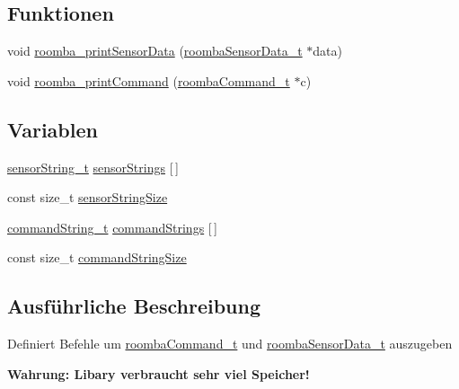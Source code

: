 \subsection*{Funktionen}
\begin{DoxyCompactItemize}
\item 
void \hyperlink{group__roomba__print_ga6def1c53657c293448ed92c962ae81c1}{roomba\-\_\-print\-Sensor\-Data} (\hyperlink{group__roomba__def_gab15b5566c76fa573575afaccd593e86a}{roomba\-Sensor\-Data\-\_\-t} $\ast$data)
\item 
void \hyperlink{group__roomba__print_ga9b86b796d2df9340222c95e7124239dd}{roomba\-\_\-print\-Command} (\hyperlink{group__roomba__def_gae2455d95f239542954d232e31bb04a0e}{roomba\-Command\-\_\-t} $\ast$c)
\end{DoxyCompactItemize}
\subsection*{Variablen}
\begin{DoxyCompactItemize}
\item 
\hyperlink{group__roomba__print_gaf352ce472b626ebab957aab98d88e93f}{sensor\-String\-\_\-t} \hyperlink{group__roomba__print_ga6c1d8b935c25685ddc669cf5732959c9}{sensor\-Strings} \mbox{[}$\,$\mbox{]}
\item 
const size\-\_\-t \hyperlink{group__roomba__print_gabad382977fd4c5e46c059079738e61a5}{sensor\-String\-Size}
\item 
\hyperlink{group__roomba__print_ga9592eed8fec0d1b2dbe577e30b8bc959}{command\-String\-\_\-t} \hyperlink{group__roomba__print_ga09654e789137e4251796c5b93e250ff8}{command\-Strings} \mbox{[}$\,$\mbox{]}
\item 
const size\-\_\-t \hyperlink{group__roomba__print_gaf00c5bc38c301b8cc77ea05a2c022406}{command\-String\-Size}
\end{DoxyCompactItemize}


\subsection{Ausführliche Beschreibung}
Definiert Befehle um \hyperlink{group__roomba__def_gae2455d95f239542954d232e31bb04a0e}{roomba\-Command\-\_\-t} und \hyperlink{group__roomba__def_gab15b5566c76fa573575afaccd593e86a}{roomba\-Sensor\-Data\-\_\-t} auszugeben

{\bfseries Wahrung\-: Libary verbraucht sehr viel Speicher!} 

